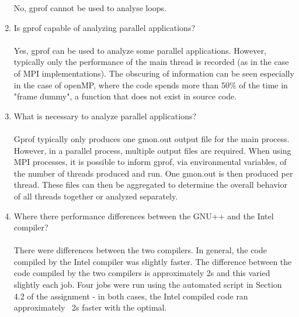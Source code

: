 \documentclass{article}
\begin{document}
\begin{enumerate}
No, gprof cannot be used to analyse loops.
\item{Is gprof capable of analyzing parallel applications?}\\\\
Yes, gprof can be used to analyze some parallel applications. However, typically only the performance of the main thread is recorded (as in the case of MPI implementations). The obscuring of information can be seen especially in the case of openMP, where the code spends more than 50\% of the time in "frame dummy", a function that does not exist in source code.
\item{What is necessary to analyze parallel applications?}\\\\
Gprof typically only produces one gmon.out output file for the main process. However, in a parallel process, multiple output files are required. When using MPI processes, it is possible to inform gprof, via environmental variables, of the number of threads produced and run. One gmon.out is then produced per thread. These files can then be aggregated to determine the overall behavior of all threads together or analyzed separately.
\item{Where there performance differences between the GNU++ and the Intel compiler?}\\\\
There were differences between the two compilers. In general, the code compiled by the Intel compiler was slightly faster. The difference between the code compiled by the two compilers is approximately 2s and this varied slightly each job. Four jobs were run using the automated script in Section 4.2 of the assignment - in both cases, the Intel compiled code ran approximately ~2s faster with the optimal.
\end{enumerate}
\end{document}
